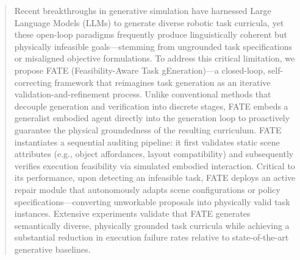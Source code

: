 \documentclass{article}
\theoremstyle{plain}
\theoremstyle{definition}
\theoremstyle{remark}
\begin{document}
\begin{abstract}
Recent breakthroughs in generative simulation have harnessed Large Language Models (LLMs) to generate diverse robotic task curricula, yet these open-loop paradigms frequently produce linguistically coherent but physically infeasible goals—stemming from ungrounded task specifications or misaligned objective formulations. To address this critical limitation, we propose FATE (Feasibility-Aware Task gEneration)—a closed-loop, self-correcting framework that reimagines task generation as an iterative validation-and-refinement process. Unlike conventional methods that decouple generation and verification into discrete stages, FATE embeds a generalist embodied agent directly into the generation loop to proactively guarantee the physical groundedness of the resulting curriculum. FATE instantiates a sequential auditing pipeline: it first validates static scene attributes (e.g., object affordances, layout compatibility) and subsequently verifies execution feasibility via simulated embodied interaction. Critical to its performance, upon detecting an infeasible task, FATE deploys an active repair module that autonomously adapts scene configurations or policy specifications—converting unworkable proposals into physically valid task instances. Extensive experiments validate that FATE generates semantically diverse, physically grounded task curricula while achieving a substantial reduction in execution failure rates relative to state-of-the-art generative baselines.
\end{abstract}
\end{document}
